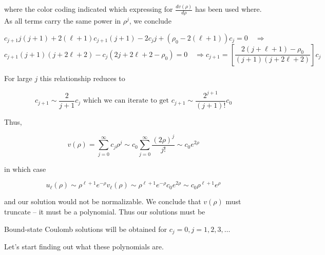 where the color coding indicated which expressing for $ \frac{d v(\rho)}{d
\rho}$ has been used where. As all terms carry the same power in $\rho^j$, we
conclude 

\[c_{j+1} j(j+1) + 2(\ell +1) c_{j+1} (j+1) - 2c_j j + (\rho_0 - 2(\ell +1))c_j
= 0\quad \Rightarrow \] 
\[ c_{j+1} (j+1)(j+2\ell +2) - c_j (2j + 2\ell + 2 - \rho_0) = 0 \quad
  \Rightarrow c_{j+1} = \left[ \frac{2(j+\ell +1) - \rho_0}{(j+1)(j+2\ell + 2)}
  \right] c_j \] \vspace{3px}


For large $j$ this relationship reduces to 

\[
  c_{j+1} \sim \frac{2}{j+1}c_j \text{ which we can iterate to get } c_{j+1}
  \sim \frac{2^{j+1}}{(j+1)!}c_0
\] \vspace{3px}

Thus, 

\[
v(\rho) = \sum_{j=0}^{\infty} c_j \rho^j \sim c_0 \sum_{j=0}^{\infty}
\frac{(2\rho)^j}{j!} \sim c_0 e^{2\rho}
\] \vspace{3px}

in which case 

\[
  u_\ell (\rho) \sim \rho^{\ell +1} e^{-\rho} v_\ell (\rho) \sim \rho^{\ell +1}
  e^{-\rho} c_0 e^{2\rho} \sim c_0 \rho^{\ell +1} e^{\rho}
\] \vspace{3px}

and our solution would not be normalizable. We conclude that $v(\rho)$ must
truncate -- it must be a polynomial. Thus our solutions must be 

\begin{subbox}{}
  Bound-state Coulomb solutions will be obtained for $c_j = 0, j = 1, 2, 3,
  \hdots$
\end{subbox}

Let's start finding out what these polynomials are. 






